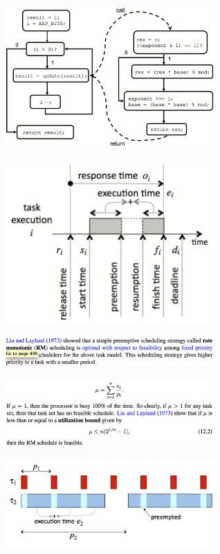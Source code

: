\documentclass[10pt,landscape]{article}
\begin{document}
\begin{multicols}{3}
\begin{center}
\includegraphics*[width = 8cm]{Fig4.png}\\
\end{center}

\begin{center}
\includegraphics*[width = 8cm]{Fig5.png}\\
\end{center}

\begin{center}
\includegraphics*[width = 8cm]{Fig6.png}\\
\end{center}

\begin{center}
\includegraphics*[width = 8cm]{Fig7.png}\\
\end{center}

\begin{center}
\includegraphics*[width = 8cm]{Fig8.png}\\
\end{center}


\end{multicols}
\end{document}
